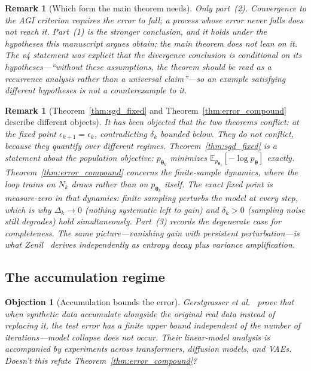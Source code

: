 \documentclass[11pt,a4paper]{article}
\newtheorem{remark}[theorem]{Remark}
\newtheorem{objection}{Objection}
\begin{document}
\begin{remark}[Which form the main theorem needs]
\label{rem:which_form}
Only part~(2). Convergence to the AGI criterion requires the error to \emph{fall}; a process whose error never falls does not reach it. Part~(1) is the stronger conclusion, and it holds under the hypotheses this manuscript argues obtain; the main theorem does not lean on it. The v4 statement was explicit that the divergence conclusion is conditional on its hypotheses---``without these assumptions, the theorem should be read as a recurrence analysis rather than a universal claim''---so an example satisfying different hypotheses is not a counterexample to it.
\end{remark}

\begin{remark}[Theorem~\ref{thm:sgd_fixed} and Theorem~\ref{thm:error_compound} describe different objects]
\label{rem:reconcile}
It has been objected that the two theorems conflict: at the fixed point $\epsilon_{k+1} = \epsilon_k$, contradicting $\delta_k$ bounded below. They do not conflict, because they quantify over different regimes. Theorem~\ref{thm:sgd_fixed} is a statement about the \emph{population} objective: $p_{\bm{\theta}_k}$ minimizes $\mathbb{E}_{p_{\bm{\theta}_k}}[-\log p_{\bm{\theta}}]$ exactly. Theorem~\ref{thm:error_compound} concerns the \emph{finite-sample} dynamics, where the loop trains on $N_k$ draws rather than on $p_{\bm{\theta}_k}$ itself. The exact fixed point is measure-zero in that dynamics: finite sampling perturbs the model at every step, which is why $\Delta_k \to 0$ (nothing systematic left to gain) and $\delta_k > 0$ (sampling noise still degrades) hold simultaneously. Part~(3) records the degenerate case for completeness. The same picture---vanishing gain with persistent perturbation---is what Zenil~\cite{limitsself2025} derives independently as entropy decay plus variance amplification.
\end{remark}

\subsection{The accumulation regime}
\label{sec:regimes}

\begin{objection}[Accumulation bounds the error]
Gerstgrasser et al.~\cite{gerstgrasser2024accumulate} prove that when synthetic data \emph{accumulate} alongside the original real data instead of replacing it, the test error has a finite upper bound independent of the number of iterations---model collapse does not occur. Their linear-model analysis is accompanied by experiments across transformers, diffusion models, and VAEs. Doesn't this refute Theorem~\ref{thm:error_compound}?
\end{objection}
\end{document}
